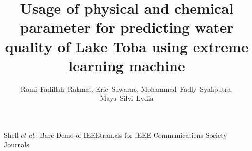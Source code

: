 \documentclass[journal,comsoc]{IEEEtran}
\begin{document}
%
\title{Usage of physical and chemical parameter for predicting water quality of Lake Toba using extreme learning machine}
%
%
%

\author{Romi~Fadillah~Rahmat,
        Eric~Suwarno,
        Mohammad~Fadly~Syahputra,
        Maya~Silvi~Lydia
}

% 
%



%
{Shell \MakeLowercase{\textit{et al.}}: Bare Demo of IEEEtran.cls for IEEE Communications Society Journals}
% 
\end{document}
